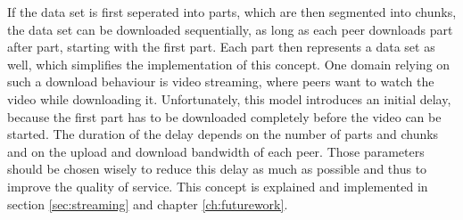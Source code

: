 If the data set is first seperated into parts, which are then segmented into chunks, the data set can be downloaded sequentially, as long as each peer downloads part after part, starting with the first part. Each part then represents a data set as well, which simplifies the implementation of this concept. One domain relying on such a download behaviour is video streaming, where peers want to watch the video while downloading it. Unfortunately, this model introduces an initial delay, because the first part has to be downloaded completely before the video can be started. The duration of the delay depends on the number of parts and chunks and on the upload and download bandwidth of each peer. Those parameters should be chosen wisely to reduce this delay as much as possible and thus to improve the quality of service. This concept is explained and implemented in section \ref{sec:streaming} and chapter \ref{ch:futurework}.

